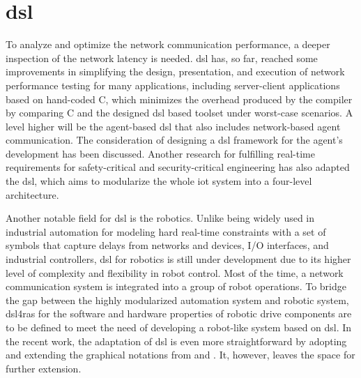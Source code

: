 \section{\gls{dsl}}
To analyze and optimize the network communication performance, a deeper 
inspection of the network latency is needed. \gls{dsl} has, so far, reached 
some improvements in simplifying the design, presentation, and execution of 
network performance testing for many applications, including server-client applications 
based on hand-coded C, which minimizes the overhead produced by the compiler by 
comparing C and the designed \gls{dsl} based toolset under worst-case scenarios.
A level higher will be the agent-based \gls{dsl} that also includes network-based 
agent communication. The consideration of designing a \gls{dsl} framework 
for the agent's development has been discussed\cite{judith_domain_2013}. Another 
research for fulfilling real-time requirements for safety-critical and 
security-critical engineering has also adapted the \gls{dsl}, which aims to 
modularize the whole \gls{iot} system into a four-level architecture\cite{sklyar_domain_2022}. 



Another notable field for \gls{dsl} is the robotics. Unlike being widely 
used in industrial automation for modeling hard real-time constraints with 
a set of symbols that capture delays from networks and devices, I/O interfaces, 
and industrial controllers\cite{hujo_toward_2022}, \gls{dsl} for robotics is still 
under development due to its higher level of complexity and flexibility in 
robot control. Most of the time, a network communication system is integrated into a group 
of robot operations. To bridge the gap between the highly modularized automation system 
and robotic system, \gls{dsl4ras} for the software and hardware 
properties of robotic drive components are to be defined to meet the need 
of developing a robot-like system based on \gls{dsl}. In the recent work\cite{vogel-heuser_delay_2023}, 
the adaptation of \gls{dsl} is even more straightforward by adopting and 
extending the graphical notations 
from \cite{hujo_toward_2022} and \cite{volpert_supporting_nodate}. It, however, 
leaves the space for further extension. 



